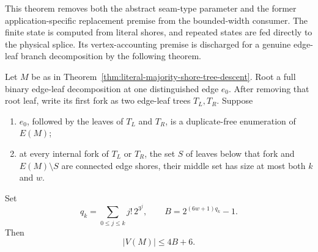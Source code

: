This theorem removes both the abstract seam-type parameter and the former
application-specific replacement premise from the bounded-width consumer.
The finite state is computed from literal shores, and repeated states are fed
directly to the physical splice.  Its vertex-accounting premise is discharged
for a genuine edge-leaf branch decomposition by the following theorem.

\begin{theorem}
\label{thm:rooted-connected-branch-decomposition}
Let \(M\) be as in Theorem~\ref{thm:literal-majority-shore-tree-descent}.
Root a full binary edge-leaf decomposition at one distinguished edge \(e_0\).
After removing that root leaf, write its first fork as two edge-leaf trees
\(T_L,T_R\).  Suppose
\begin{enumerate}
\item \(e_0\), followed by the leaves of \(T_L\) and \(T_R\), is a
duplicate-free enumeration of \(E(M)\);
\item at every internal fork of \(T_L\) or \(T_R\), the set \(S\) of leaves
below that fork and \(E(M)\setminus S\) are connected edge shores, their
middle set has size at most both \(k\) and \(w\).
\end{enumerate}
Set
\[
             q_k=\sum_{0\le j\le k}j!\,2^{3^j},
             \qquad B=2^{(6w+1)q_k}-1.
\]
Then
\[
                         |V(M)|\le 4B+6.
\]
\end{theorem}

